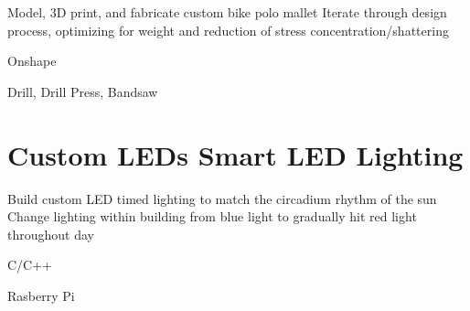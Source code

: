 \vspace{-2.5ex}

\begin{detail}
    \BulletItem
    Model, 3D print, and fabricate custom bike polo mallet
    \BulletItem
    Iterate through design process, optimizing for weight and reduction of stress concentration/shattering
\end{detail}

\begin{subtitle}
    \vspace{-5ex}
    {{}} 
\end{subtitle}

\vspace{-1.5ex}
{
    \vspace{-0.8ex}
    \color{cyan}\small
    {Onshape} %
}

{
    \vspace{-2.5ex}\hspace{1.5in}
    \color{cyan}\small
    {Drill, Drill Press, Bandsaw} %
}

\vspace{2.5ex}



\section{
    \textbf{Custom LEDs} \newline
    Smart LED Lighting
}{}

\vspace{-2.5ex}

\begin{detail}
    \BulletItem
    Build custom LED timed lighting to match the circadium rhythm of the sun 
    \BulletItem
    Change lighting within building from blue light to gradually hit red light throughout day
\end{detail}

\begin{subtitle}
    \vspace{-5ex}
    {{}} 
\end{subtitle}

\vspace{-1.5ex}
{
    \vspace{-0.8ex}
    \color{cyan}\small
    {C/C++} %
}

{
    \vspace{-2.5ex}\hspace{1.5in}
    \color{cyan}\small
    {Rasberry Pi} %
}

